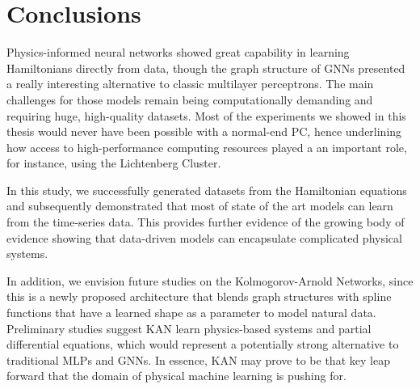\chapter{Conclusions}
Physics-informed neural networks showed great capability in learning Hamiltonians directly from data, though the graph structure of GNNs presented a really interesting alternative to classic multilayer perceptrons. The main challenges for those models remain being computationally demanding and requiring huge, high-quality datasets. Most of the experiments we showed in this thesis would never have been possible with a normal-end PC, hence underlining how access to high-performance computing resources played a an important role, for instance, using the Lichtenberg Cluster.

In this study, we successfully generated datasets from the Hamiltonian equations and subsequently demonstrated that most of state of the art models  can learn from the time-series data. This provides further evidence of the growing body of evidence showing that data-driven models can encapsulate complicated physical systems.

In addition, we envision future studies on the Kolmogorov-Arnold Networks, since this is a newly proposed architecture that blends graph structures with spline functions that have a learned shape as a parameter to model natural data. Preliminary studies suggest KAN learn physics-based systems and partial differential equations, which would represent a potentially strong alternative to traditional MLPs and GNNs.\cite{kan} In essence, KAN may prove to be that key leap forward that the domain of physical machine learning is pushing for.
   